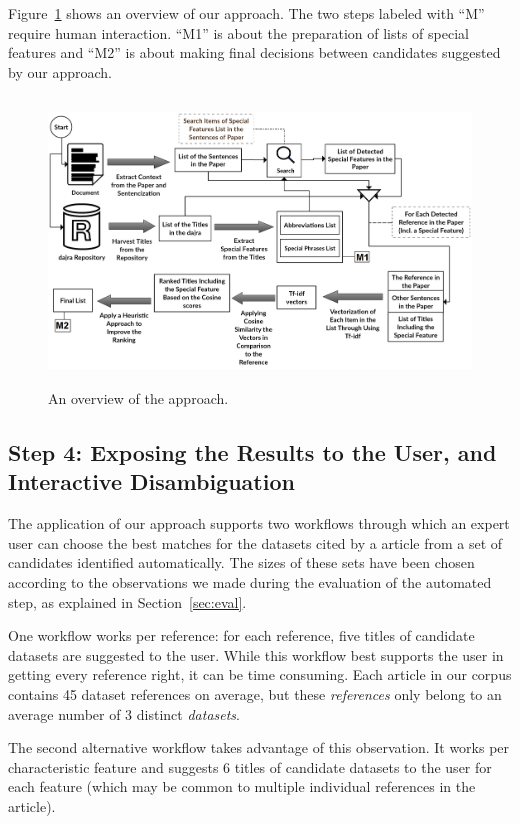 \documentclass{IOS-Book-Article}
\begin{document}
Figure~\ref{fig:Overview_of_approach} shows an overview of our approach.
The two steps labeled with \enquote{M} require human interaction.
\enquote{M1} is about the preparation of lists of special features and \enquote{M2} is about making final decisions between candidates suggested by our approach.

\begin{figure}[h]
	\centering
	\includegraphics[height=3in]{Overwveiw_System.png}
	\caption{An overview of the approach.}
	\label{fig:Overview_of_approach}
\end{figure}

\subsection{Step 4: Exposing the Results to the User, and Interactive Disambiguation}
\label{sec:expos-results-reus}	
The application of our approach supports two workflows through which an expert user can choose the best matches for the datasets cited by a article from a set of candidates identified automatically. The sizes of these sets have been chosen according to the observations we made during the evaluation of the automated step, as explained in Section~\ref{sec:eval}.

One workflow works per reference: for each reference, five titles of candidate datasets are suggested to the user.
While this workflow best supports the user in getting every reference right, it can be time consuming.
Each article in our corpus contains 45 dataset references on average, but these \emph{references} only belong to an average number of 3 distinct \emph{datasets}.

The second alternative workflow takes advantage of this observation.
It works per characteristic feature and suggests 6 titles of candidate datasets to the user for each feature (which may be common to multiple individual references in the article). 
\end{document}
